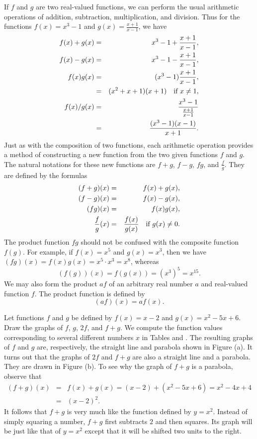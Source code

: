 If $f$ and $g$ are two real-valued functions,
we can perform the usual arithmetic operations of
addition, subtraction, multiplication, and division.
Thus for the functions
$f(x) = x^3 - 1$ and $g(x) = \frac{x + 1}{x - 1}$,
we have
\begin{eqnarray*}
f(x) + g(x)
&=& x^3 - 1 + \frac{x + 1}{x - 1} ,     \\
f(x) - g(x)
&=& x^3 - 1 - \frac{x + 1}{x - 1} ,     \\
f(x)g(x)
&=& (x^3 -1) \frac{x + 1}{x - 1} ,      \\
&=& (x^2 + x + 1)(x + 1)   \quad \mbox{if $x \neq 1$},   \\
f(x)/g(x)
&=& \frac{x^3 - 1}{\frac{x + 1}{x - 1}} \\
&=& \frac{(x^3 - 1)(x - 1)}{x + 1}.
\end{eqnarray*}
Just as with the composition of two functions,
each arithmetic operation
provides a method of constructing a new function
from the two given functions $f$ and $g$.
The natural notations for these new functions are
$f + g$, $f - g$, $fg$, and $\frac{f}{g}$.
They are defined by the formulas 
\begin{eqnarray*}
(f + g)(x)
&=& f(x) + g(x), \\
(f - g)(x)
&=& f(x) - g(x),  \\
(fg)(x)
&=& f(x)g(x),     \\
{\frac{f}{g}}(x)
&=& \frac{f(x)}{g(x)} \quad \mbox{if $g(x) \neq 0$}.
\end{eqnarray*}
The product function $fg$ should not be confused with
the composite function $f(g)$.
For example, if $f(x) = x^5$ and $g(x) = x^3$,
then we have $(fg)(x) = f(x)g(x) = {x^5} \cdot {x^3} = x^8$,
whereas
\[
(f(g))(x) = f(g(x)) = (x^3)^5 = x^{15}.
\]
We may also form the product $af$ of an arbitrary real number $a$
and real-valued function $f$.
The product function is defined by
\[
(af)(x)= af(x).
\]


\begin{example}\label{exam 1.3.1}
Let functions $f$ and $g$ be defined by
$f(x) = x - 2$ and $g(x) = x^2 - 5x + 6$.
Draw the graphs of $f$, $g$, $2f$, and $f + g$.
We compute the function values
corresponding to several different numbers $x$ in
Tables  and .
The resulting graphs of $f$ and $g$ are, respectively,
the straight line and parabola shown in Figure (a).
It turns out that the graphs of $2f$ and $f + g$
are also a straight line and a parabola.
They are drawn in Figure (b).
To see why the graph of $f + g$ is a parabola,
observe that 
\begin{eqnarray*}
(f + g)(x)
&=& f(x) + g(x)
 = (x - 2) + (x^2 - 5x + 6) = x^2 - 4x + 4 \\
&=& (x - 2)^2.
\end{eqnarray*}
It follows that $f + g$ is very much like
the function defined by $y = x^2$.
Instead of simply squaring a number,
$f + g$ first subtracts $2$ and then squares.
Its graph will be just like that of $y = x^2$
except that it will be shifted two units to the right.
\end{example}

